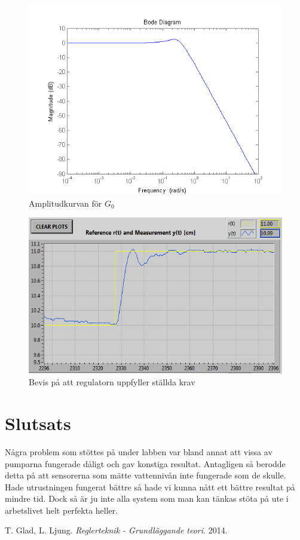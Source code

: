 \documentclass[a4paper]{article}
\begin{document}
\begin{figure}[H]
  \centering
  \includegraphics{bodemagG}
  \caption{Amplitudkurvan för $G_0$}
\end{figure}

\begin{figure}[H]
  \centering
  \includegraphics[scale=1]{lab2-the-best}  
  \caption{Bevis på att regulatorn uppfyller ställda krav}
\end{figure}

\section{Slutsats}

Några problem som stöttes på under labben var bland annat att vissa av pumparna fungerade dåligt och gav konstiga resultat.
Antagligen så berodde detta på att sensorerna som mätte vattennivån inte fungerade som de skulle.
Hade utrustningen fungerat bättre så hade vi kunna nått ett bättre resultat på mindre tid.
Dock så är ju inte alla system som man kan tänkas stöta på ute i arbetslivet helt perfekta heller. 

\begin{thebibliography}{9}
    T. Glad, L. Ljung. 
    \emph{Reglerteknik - Grundläggande teori}.
    2014.
\end{thebibliography}
\end{document}
